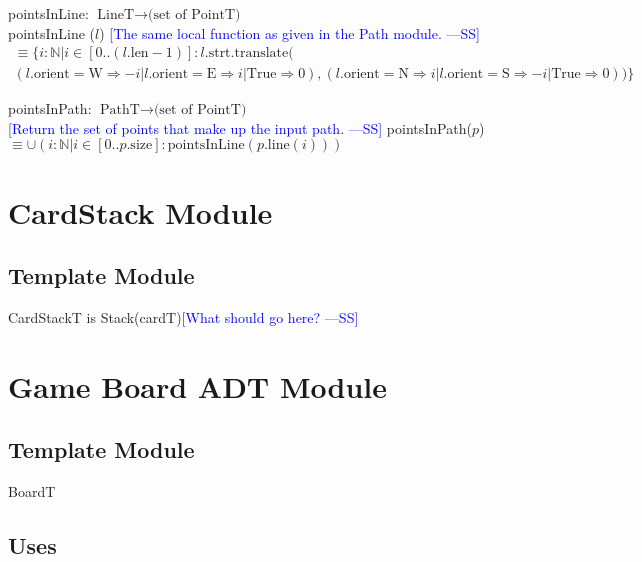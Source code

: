 \documentclass[12pt]{article}
\newcommand{\authornote}[3]{\textcolor{#1}{[#3 ---#2]}}
\newcommand{\authornote}[3]{}
\newcommand{\wss}[1]{\authornote{blue}{SS}{#1}}
\begin{document}
\noindent pointsInLine: $\mbox{LineT} \rightarrow \mbox{(set of PointT)}$\\
\noindent pointsInLine ($l$) 
\wss{The same local function as given in the Path module.}
\begin{multline*}
\equiv \{ i: \mathbb{N} | i \in [0
  .. (l.\mbox{len} - 1)] : l.\mbox{strt}.\mbox{translate}(\\
(l.\mbox{orient}=\mbox{W} \Rightarrow -i |
  l.\mbox{orient}=\mbox{E} \Rightarrow i | \mbox{True} \Rightarrow 0), (l.\mbox{orient}=\mbox{N} \Rightarrow i |
  l.\mbox{orient}=\mbox{S} \Rightarrow -i | \mbox{True} \Rightarrow 0) ) \}
\end{multline*}

\noindent pointsInPath: $\mbox{PathT} \rightarrow \mbox{(set of PointT)}$\\
\wss{Return the set of points that make up the input path.}
\noindent pointsInPath($p$) 
$\equiv \cup (i: \mathbb{N} | i \in [0..p.\mbox{size}]:
\mbox{pointsInLine}(p.\mbox{line}(i)))$



\newpage

\section* {CardStack Module}

\subsection* {Template Module}

CardStackT is Stack(cardT)\wss{What should go here?}










\newpage

\section* {Game Board ADT Module}

\subsection*{Template Module}

BoardT

\subsection* {Uses}
\end{document}
